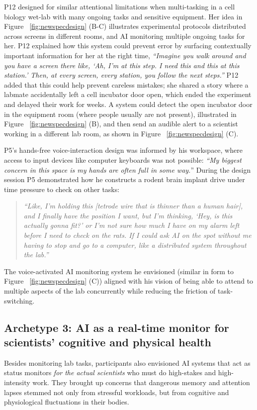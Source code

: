 P12 designed for similar attentional limitations when multi-tasking in a cell biology wet-lab with many ongoing tasks and sensitive equipment. Her idea in Figure ~\ref{fig:newspecdesign} (B-C) illustrates experimental protocols distributed across screens in different rooms, and AI monitoring multiple ongoing tasks for her. P12 explained how this system could prevent error by surfacing contextually important information for her at the right time, \textit{``Imagine you walk around and you have a screen there like, `Ah, I'm at this step. I need this and this at this station.' Then, at every screen, every station, you follow the next steps.''} P12 added that this could help prevent careless mistakes; she shared a story where a labmate accidentally left a cell incubator door open, which ended the experiment and delayed their work for weeks. A system could detect the open incubator door in the equipment room (where people usually are not present), illustrated in Figure ~\ref{fig:newspecdesign} (B), and then send an audible alert to a scientist working in a different lab room, as shown in Figure ~\ref{fig:newspecdesign} (C).

P5's hands-free voice-interaction design was informed by his workspace, where access to input devices like computer keyboards was not possible: \textit{``My biggest concern in this space is my hands are often full in some way.}'' During the design session P5 demonstrated how he constructs a rodent brain implant drive under time pressure to check on other tasks:

\begin{quote}
    \textit{``Like, I'm holding this [tetrode wire that is thinner than a human hair], and I finally have the position I want, but I'm thinking, `Hey, is this actually gonna fit?' or I'm not sure how much I have on my alarm left before I need to check on the rats. If I could ask AI on the spot without me having to stop and go to a computer, like a distributed system throughout the lab.''}
\end{quote}

The voice-activated AI monitoring system he envisioned (similar in form to Figure ~\ref{fig:newspecdesign} (C)) aligned with his vision of being able to attend to multiple aspects of the lab concurrently while reducing the friction of task-switching.


\subsection{\textbf{Archetype 3: AI as a real-time monitor for scientists' cognitive and physical health}} Besides monitoring lab tasks, participants also envisioned AI systems that act as status monitors \emph{for the actual scientists} who must do high-stakes and high-intensity work. They brought up concerns that dangerous memory and attention lapses stemmed not only from stressful workloads, but from cognitive and physiological fluctuations in their bodies.

